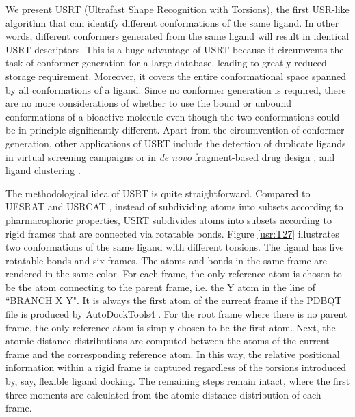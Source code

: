 We present USRT (Ultrafast Shape Recognition with Torsions), the first USR-like algorithm that can identify different conformations of the same ligand. In other words, different conformers generated from the same ligand will result in identical USRT descriptors. This is a huge advantage of USRT because it circumvents the task of conformer generation for a large database, leading to greatly reduced storage requirement. Moreover, it covers the entire conformational space spanned by all conformations of a ligand. Since no conformer generation is required, there are no more considerations of whether to use the bound or unbound conformations of a bioactive molecule even though the two conformations could be in principle significantly different. Apart from the circumvention of conformer generation, other applications of USRT include the detection of duplicate ligands in virtual screening campaigns \citep{1390} or in \textit{de novo} fragment-based drug design \citep{1409,1387}, and ligand clustering \citep{1280,1332}.

The methodological idea of USRT is quite straightforward. Compared to UFSRAT \citep{1436} and USRCAT \citep{1331}, instead of subdividing atoms into subsets according to pharmacophoric properties, USRT subdivides atoms into subsets according to rigid frames that are connected via rotatable bonds. Figure \ref{usr:T27} illustrates two conformations of the same ligand with different torsions. The ligand has five rotatable bonds and six frames. The atoms and bonds in the same frame are rendered in the same color. For each frame, the only reference atom is chosen to be the atom connecting to the parent frame, i.e. the Y atom in the line of ``BRANCH X Y". It is always the first atom of the current frame if the PDBQT file is produced by AutoDockTools4 \citep{596}. For the root frame where there is no parent frame, the only reference atom is simply chosen to be the first atom. Next, the atomic distance distributions are computed between the atoms of the current frame and the corresponding reference atom. In this way, the relative positional information within a rigid frame is captured regardless of the torsions introduced by, say, flexible ligand docking. The remaining steps remain intact, where the first three moments are calculated from the atomic distance distribution of each frame.

